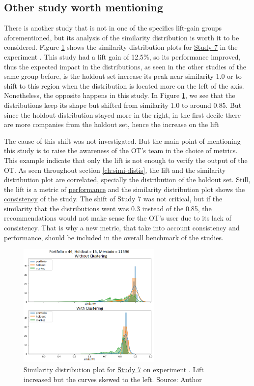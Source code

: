 \subsection{Other study worth mentioning}

There is another study that is not in one of the specifics lift-gain groups aforementioned, but its analysis of the similarity distribution is worth it to be considered. Figure \ref{fig:worth-mentioning-study-7} shows the similarity distribution plots for \underline{Study 7} in the experiment \nameExperimentII{}. This study had a lift gain of 12.5\%, so its performance improved, thus the expected impact in the distributions, as seen in the other studies of the same group before, is the holdout set increase its peak near similarity 1.0 or to shift to this region when the distribution is located more on the left of the axis. Nonetheless, the opposite happens in this study. In Figure \ref{fig:worth-mentioning-study-7}, we see that the distributions keep its shape but shifted from similarity 1.0 to around 0.85. But since the holdout distribution stayed more in the right, in the first decile there are more companies from the holdout set, hence the increase on the lift

The cause of this shift was not investigated. But the main point of mentioning this study is to raise the awareness of the OT's team in the choice of metrics. This example indicate that only the lift is not enough to verify the output of the OT. As seen throughout section \ref{ch:simi-distis}, the lift and the similarity distribution plot are correlated, specially the distribution of the holdout set. Still, the lift is a metric of \underline{performance} and the similarity distribution plot shows the \underline{consistency} of the study. The shift of Study 7 was not critical, but if the similarity that the distributions went was 0.3 instead of the 0.85, the recommendations would not make sense for the OT's user due to its lack of consistency. That is why a new metric, that take into account consistency and performance, should be included in the overall benchmark of the studies.

\begin{figure}[h]
   \centering
   \includegraphics[width=7cm]{fig/ch4-worth-mentioning-study-7.png}
   \caption{Similarity distribution plot for \underline{Study 7} on experiment \nameExperimentII{}. Lift increased but the curves skewed to the left. Source: Author}
   \label{fig:worth-mentioning-study-7}
\end{figure}

